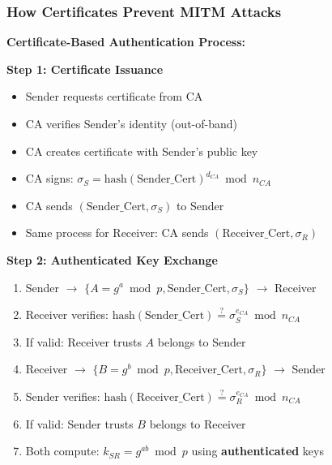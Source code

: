 \documentclass[a4paper,12pt]{extarticle}
\begin{document}
\vspace{0.3cm}



\subsubsection*{How Certificates Prevent MITM Attacks}

\begin{tcolorbox}[
    enhanced,
    colback=yellow!10,
    colframe=orange!80!black,
    boxrule=1.5pt,
    arc=3mm,
    left=10pt, right=10pt, top=10pt, bottom=10pt
]
\textbf{Certificate-Based Authentication Process:}

\textbf{Step 1: Certificate Issuance}
\begin{itemize}
    \item Sender requests certificate from CA
    \item CA verifies Sender's identity (out-of-band)
    \item CA creates certificate with Sender's public key
    \item CA signs: $\sigma_S = \text{hash}(\text{Sender\_Cert})^{d_{CA}} \bmod n_{CA}$
    \item CA sends $(\text{Sender\_Cert}, \sigma_S)$ to Sender
    \item Same process for Receiver: CA sends $(\text{Receiver\_Cert}, \sigma_R)$
\end{itemize}

\textbf{Step 2: Authenticated Key Exchange}
\begin{enumerate}
    \item Sender $\rightarrow$ $\{A = g^a \bmod p, \text{Sender\_Cert}, \sigma_S\}$ $\rightarrow$ Receiver
    \item Receiver verifies: $\text{hash}(\text{Sender\_Cert}) \stackrel{?}{=} \sigma_S^{e_{CA}} \bmod n_{CA}$
    \item If valid: Receiver trusts $A$ belongs to Sender
    \item Receiver $\rightarrow$ $\{B = g^b \bmod p, \text{Receiver\_Cert}, \sigma_R\}$ $\rightarrow$ Sender
    \item Sender verifies: $\text{hash}(\text{Receiver\_Cert}) \stackrel{?}{=} \sigma_R^{e_{CA}} \bmod n_{CA}$
    \item If valid: Sender trusts $B$ belongs to Receiver
    \item Both compute: $k_{SR} = g^{ab} \bmod p$ using \textbf{authenticated} keys
\end{enumerate}


\end{tcolorbox}
\end{document}
